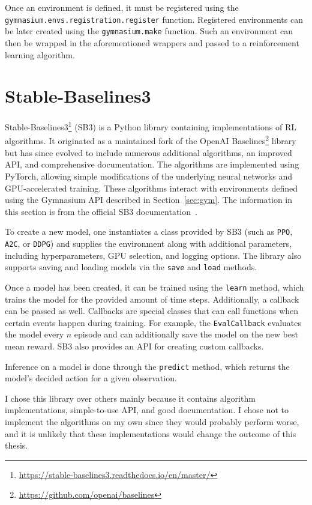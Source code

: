 \documentclass[
  digital,     %
  oneside,     %
  nosansbold,  %
  nocolorbold, %
  lof,         %
  lot,         %
]{fithesis4}
\begin{document}
Once an environment is defined, it must be registered using the \texttt{gymnasium.envs.registration.register} function. Registered environments can be later created using the \texttt{gymnasium.make} function. Such an environment can then be wrapped in the aforementioned wrappers and passed to a reinforcement learning algorithm.

\section{Stable-Baselines3}
Stable-Baselines3\footnote{\url{https://stable-baselines3.readthedocs.io/en/master/}} (SB3) is a Python library containing implementations of RL algorithms. It originated as a maintained fork of the OpenAI Baselines\footnote{\url{https://github.com/openai/baselines}} library but has since evolved to include numerous additional algorithms, an improved API, and comprehensive documentation. The algorithms are implemented using PyTorch, allowing simple modifications of the underlying neural networks and GPU-accelerated training. These algorithms interact with environments defined using the Gymnasium API described in Section~\ref{sec:gym}. The information in this section is from the official SB3 documentation~\cite{SB3-docs}.

To create a new model, one instantiates a class provided by SB3 (such as \texttt{PPO}, \texttt{A2C}, or \texttt{DDPG}) and supplies the environment along with additional parameters, including hyperparameters, GPU selection, and logging options. The library also supports saving and loading models via the \texttt{save} and \texttt{load} methods.

Once a model has been created, it can be trained using the \texttt{learn} method, which trains the model for the provided amount of time steps. Additionally, a callback can be passed as well. Callbacks are special classes that can call functions when certain events happen during training. For example, the \texttt{EvalCallback} evaluates the model every $n$ episode and can additionally save the model on the new best mean reward. SB3 also provides an API for creating custom callbacks.

Inference on a model is done through the \texttt{predict} method, which returns the model's decided action for a given observation.

I chose this library over others mainly because it contains algorithm implementations, simple-to-use API, and good documentation. I chose not to implement the algorithms on my own since they would probably perform worse, and it is unlikely that these implementations would change the outcome of this thesis.
\end{document}
